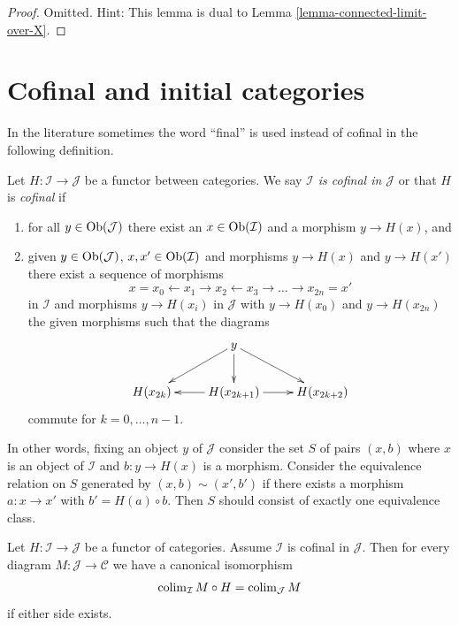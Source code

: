 \begin{proof}
Omitted. Hint: This lemma is dual to Lemma \ref{lemma-connected-limit-over-X}.
\end{proof}




\section{Cofinal and initial categories}
\label{section-cofinal}

\noindent
In the literature sometimes the word ``final'' is used instead of cofinal
in the following definition.

\begin{definition}
\label{definition-cofinal}
Let $H : \mathcal{I} \to \mathcal{J}$ be a functor between categories.
We say {\it $\mathcal{I}$ is cofinal in $\mathcal{J}$} or that
$H$ is {\it cofinal} if
\begin{enumerate}
\item for all $y \in \mathop{\mathrm{Ob}}\nolimits(\mathcal{J})$ there exist an
$x \in \mathop{\mathrm{Ob}}\nolimits(\mathcal{I})$ and a morphism $y \to H(x)$, and
\item given $y \in \mathop{\mathrm{Ob}}\nolimits(\mathcal{J})$, $x, x' \in \mathop{\mathrm{Ob}}\nolimits(\mathcal{I})$
and morphisms $y \to H(x)$ and $y \to H(x')$ there exist a sequence
of morphisms
$$
x = x_0 \leftarrow x_1 \rightarrow x_2 \leftarrow x_3 \rightarrow \ldots
\rightarrow x_{2n} = x'
$$
in $\mathcal{I}$ and morphisms $y \to H(x_i)$ in $\mathcal{J}$
with $y \to H(x_0)$ and $y \to H(x_{2n})$ the given morphisms
such that the diagrams
$$
\xymatrix{
& y \ar[ld] \ar[d] \ar[rd] \\
H(x_{2k}) & H(x_{2k + 1}) \ar[l] \ar[r] & H(x_{2k + 2})
}
$$
commute for $k = 0, \ldots, n - 1$.
\end{enumerate}
In other words, fixing an object $y$ of $\mathcal{J}$ consider the
set $S$ of pairs $(x, b)$ where $x$ is an object of $\mathcal{I}$ and
$b : y \to H(x)$ is a morphism. Consider the equivalence relation
on $S$ generated by $(x, b) \sim (x', b')$ if there exists a
morphism $a : x \to x'$ with $b' = H(a) \circ b$. Then $S$ should
consist of exactly one equivalence class.
\end{definition}

\begin{lemma}
\label{lemma-cofinal}
Let $H : \mathcal{I} \to \mathcal{J}$ be a functor of categories. Assume
$\mathcal{I}$ is cofinal in $\mathcal{J}$. Then for every diagram
$M : \mathcal{J} \to \mathcal{C}$ we have a canonical isomorphism
$$
\mathop{\mathrm{colim}}\nolimits_\mathcal{I} M \circ H
=
\mathop{\mathrm{colim}}\nolimits_\mathcal{J} M
$$
if either side exists.
\end{lemma}

